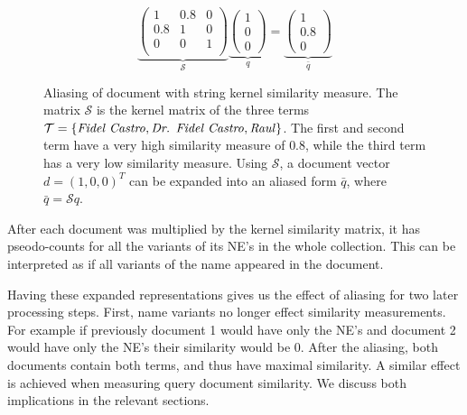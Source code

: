 \begin{figure}[ht]
  \caption{Aliasing of document with string kernel similarity measure.
The matrix $\mathcal{S}$ is the kernel matrix of the three terms $\mathcal{T} = \lbrace
\text{\emph{Fidel Castro}},\text{\emph{Dr. Fidel Castro}}, \text{\emph{Raul}}\rbrace$. The first and second term have a
very high similarity measure of $0.8$, while the third term has a very low similarity measure. Using
$\mathcal{S}$, a document vector $d=(1,0,0)^T$ can be expanded into an aliased form
$\bar q$, where $\bar q = \mathcal{S}q$.}
  \[
     \underbrace{\begin{pmatrix}
      1   & 0.8 & 0\\
      0.8 & 1   & 0\\
      0   & 0   & 1\\
     \end{pmatrix}}_{\mathcal{S}}
     \underbrace{\begin{pmatrix}
     1\\ 0\\0 
     \end{pmatrix}}_{q}
     =
     \underbrace{\begin{pmatrix}
     1\\ 0.8\\0 
     \end{pmatrix}}_{\bar q}
  \]
  \label{eq:example_string_sim}
\end{figure}

After each document was multiplied by the kernel similarity matrix, it has pseodo-counts for all the variants of its NE's in the whole collection. This can be interpreted as if all variants of the name appeared in the document. 

Having these expanded representations gives us the effect of aliasing for two later processing steps. First, name variants no longer effect similarity measurements. For example if previously document 1 would have only the NE's  and document 2 would have only the NE's  their similarity would be 0. After the aliasing, both documents contain both terms, and thus have maximal similarity. A similar effect is achieved when measuring query document similarity. We discuss both implications in the relevant sections.


